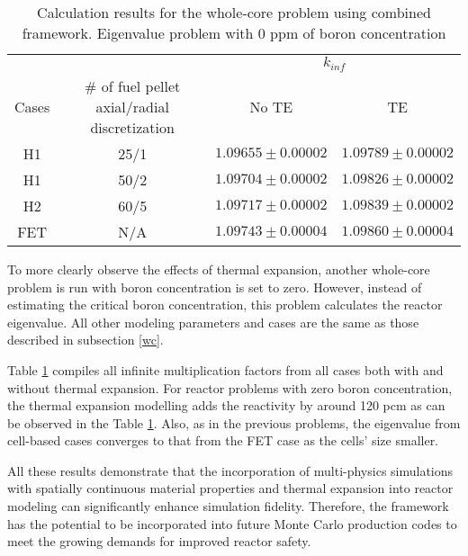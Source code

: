 \begin{table}
    \centering
    \caption[Eigenvalue results for the whole-core problem using combined framework.]{Calculation results for the whole-core problem using combined framework. Eigenvalue problem with 0 ppm of boron concentration}
    \label{tab432} 
    \begin{tabular}{| c | c | c | c | }
    \hline 
       &   & \multicolumn{2}{c|}{$k_{inf}$}       \\
    \cline{3-4}
     Cases & \# of fuel pellet axial/radial discretization & No TE & TE \\
     \hline
     H1     & 25/1  & $1.09655\pm0.00002$ & $1.09789\pm0.00002$      \\ \hline
     H1     & 50/2  & $1.09704\pm0.00002$ & $1.09826\pm0.00002$      \\ \hline
     H2     & 60/5  & $1.09717\pm0.00002$ & $1.09839\pm0.00002$      \\ \hline
     FET    & N/A   & $1.09743\pm0.00004$ & $1.09860\pm0.00004$      \\ \hline
    \end{tabular}
\end{table}

To more clearly observe the effects of thermal expansion, another whole-core problem is run with boron concentration is set to zero. However, instead of estimating the critical boron concentration, this problem calculates the reactor eigenvalue. All other modeling parameters and cases are the same as those described in subsection \ref{wc}.

Table \ref{tab432} compiles all infinite multiplication factors from all cases both with and without thermal expansion. For reactor problems with zero boron concentration, the thermal expansion modelling adds the reactivity by around 120 pcm as can be observed in the Table \ref{tab432}. Also, as in the previous problems, the eigenvalue from cell-based cases converges to that from the FET case as the cells' size smaller.

All these results demonstrate that the incorporation of multi-physics simulations with spatially continuous material properties and thermal expansion into reactor modeling can significantly enhance simulation fidelity. Therefore, the framework has the potential to be incorporated into future Monte Carlo production codes to meet the growing demands for improved reactor safety.